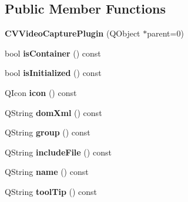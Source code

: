 \subsection*{Public Member Functions}
\begin{DoxyCompactItemize}
\item 
\mbox{\label{class_c_v_video_capture_plugin_aafc4f157789995bf66f60f74eb052fd9}} 
{\bfseries C\+V\+Video\+Capture\+Plugin} (Q\+Object $\ast$parent=0)
\item 
\mbox{\label{class_c_v_video_capture_plugin_af23d00eff7038b29c5599da2d4b13623}} 
bool {\bfseries is\+Container} () const
\item 
\mbox{\label{class_c_v_video_capture_plugin_acd60aab736414d0e1fd8060c83ebe511}} 
bool {\bfseries is\+Initialized} () const
\item 
\mbox{\label{class_c_v_video_capture_plugin_a4a74ffb33b1bbb38083477579ea0bd98}} 
Q\+Icon {\bfseries icon} () const
\item 
\mbox{\label{class_c_v_video_capture_plugin_ab05a86e96b864f2d6be82379cf52fc76}} 
Q\+String {\bfseries dom\+Xml} () const
\item 
\mbox{\label{class_c_v_video_capture_plugin_ab83f47c2381dc2fb72ffed000d8d26bb}} 
Q\+String {\bfseries group} () const
\item 
\mbox{\label{class_c_v_video_capture_plugin_afe449854c10995285639c7023c915d49}} 
Q\+String {\bfseries include\+File} () const
\item 
\mbox{\label{class_c_v_video_capture_plugin_a5d37275615295d66592a6abadc7514a1}} 
Q\+String {\bfseries name} () const
\item 
\mbox{\label{class_c_v_video_capture_plugin_a7a4bbb77d1f4ee52e683e83e86926685}} 
Q\+String {\bfseries tool\+Tip} () const
\item 
\mbox{\label{class_c_v_video_capture_plugin_abcbda6d30136c266793674eb53ba1bf4}} 

\end{DoxyCompactItemize}

